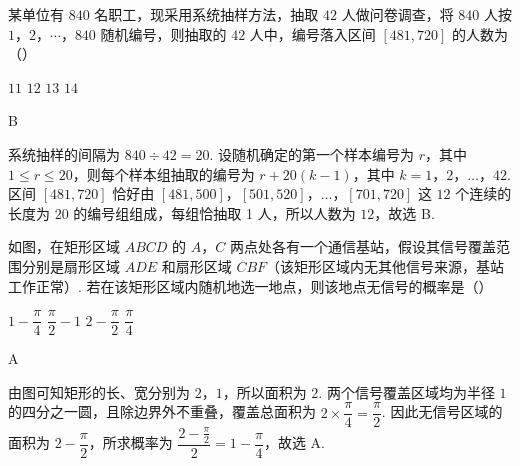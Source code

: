 \begin{problem}
某单位有 \(840\) 名职工，现采用系统抽样方法，抽取 \(42\) 人做问卷调查，将 \(840\) 人按 \(1\)，\(2\)，\(\cdots\)，\(840\) 随机编号，则抽取的 \(42\) 人中，编号落入区间 \([481,720]\) 的人数为（\quad）

\choices
    {\(11\)}
    {\(12\)}
    {\(13\)}
    {\(14\)}

\begin{answer}
B
\end{answer}

\begin{solution}
系统抽样的间隔为 \(840\div42=20\). 设随机确定的第一个样本编号为 \(r\)，其中 \(1\leqslant r\leqslant20\)，则每个样本组抽取的编号为 \(r+20(k-1)\)，其中 \(k=1\)，\(2\)，\(\ldots\)，\(42\). 区间 \([481,720]\) 恰好由 \([481,500]\)，\([501,520]\)，\(\ldots\)，\([701,720]\) 这 \(12\) 个连续的长度为 \(20\) 的编号组组成，每组恰抽取 1 人，所以人数为 \(12\)，故选 B.
\end{solution}
\end{problem}

\begin{problem}
如图，在矩形区域 \(ABCD\) 的 \(A\)，\(C\) 两点处各有一个通信基站，假设其信号覆盖范围分别是扇形区域 \(ADE\) 和扇形区域 \(CBF\)（该矩形区域内无其他信号来源，基站工作正常）. 若在该矩形区域内随机地选一地点，则该地点无信号的概率是（\quad）


\choices
    {\(1-\dfrac{\pi}{4}\)}
    {\(\dfrac{\pi}{2}-1\)}
    {\(2-\dfrac{\pi}{2}\)}
    {\(\dfrac{\pi}{4}\)}

\begin{answer}
A
\end{answer}

\begin{solution}
由图可知矩形的长、宽分别为 \(2\)，\(1\)，所以面积为 \(2\). 两个信号覆盖区域均为半径 \(1\) 的四分之一圆，且除边界外不重叠，覆盖总面积为 \(2\times\dfrac{\pi}{4}=\dfrac{\pi}{2}\). 因此无信号区域的面积为 \(2-\dfrac{\pi}{2}\)，所求概率为 \(\dfrac{2-\frac{\pi}{2}}{2}=1-\dfrac{\pi}{4}\)，故选 A.
\end{solution}
\end{problem}

